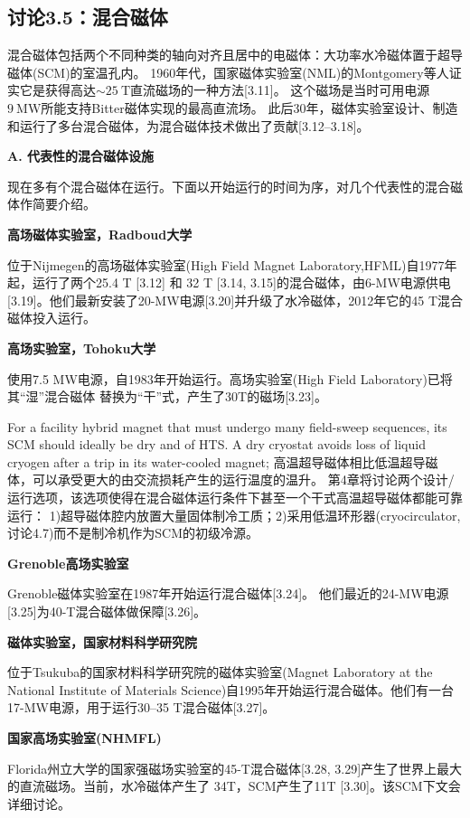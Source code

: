 \subsection{讨论3.5：混合磁体}
混合磁体包括两个不同种类的轴向对齐且居中的电磁体：大功率水冷磁体置于超导磁体(SCM)的室温孔内。
1960年代，国家磁体实验室(NML)的Montgomery等人证实它是获得高达$\sim 25\ \mathrm{T}$直流磁场的一种方法[3.11]。
这个磁场是当时可用电源$9\ \mathrm{MW}$所能支持Bitter磁体实现的最高直流场。
此后30年，磁体实验室设计、制造和运行了多台混合磁体，为混合磁体技术做出了贡献[3.12–3.18]。

\textbf{A. 代表性的混合磁体设施}

现在多有个混合磁体在运行。下面以开始运行的时间为序，对几个代表性的混合磁体作简要介绍。

\textbf{\kaishu 高场磁体实验室，Radboud大学}

位于Nijmegen的高场磁体实验室(High Field Magnet Laboratory,HFML)自1977年起，运行了两个25.4 T [3.12] 和 32 T [3.14, 3.15]的混合磁体，由6-MW电源供电[3.19]。他们最新安装了20-MW电源[3.20]并升级了水冷磁体，2012年它的45 T混合磁体投入运行。

\textbf{\kaishu 高场实验室，Tohoku大学}

使用7.5 MW电源，自1983年开始运行。高场实验室(High Field Laboratory)已将其“湿”混合磁体
替换为“干”式，产生了30T的磁场[3.23]。

For a facility hybrid magnet that must undergo many field-sweep sequences, its
SCM should ideally be dry and of HTS. A dry cryostat avoids loss of liquid cryogen
after a trip in its water-cooled magnet;
高温超导磁体相比低温超导磁体，可以承受更大的由交流损耗产生的运行温度的温升。
第4章将讨论两个设计/运行选项，该选项使得在混合磁体运行条件下甚至一个干式高温超导磁体都能可靠运行：
1)超导磁体腔内放置大量固体制冷工质；2)采用低温环形器(cryocirculator,讨论4.7)而不是制冷机作为SCM的初级冷源。

\textbf{\kaishu Grenoble高场实验室}

Grenoble磁体实验室在1987年开始运行混合磁体[3.24]。
他们最近的24-MW电源[3.25]为40-T混合磁体做保障[3.26]。

\textbf{\kaishu 磁体实验室，国家材料科学研究院}

位于Tsukuba的国家材料科学研究院的磁体实验室(Magnet Laboratory at the National Institute of Materials Science)自1995年开始运行混合磁体。他们有一台17-MW电源，用于运行30–35 T混合磁体[3.27]。

\textbf{\kaishu 国家高场实验室(NHMFL)}

Florida州立大学的国家强磁场实验室的45-T混合磁体[3.28, 3.29]产生了世界上最大的直流磁场。当前，水冷磁体产生了
34T，SCM产生了11T [3.30]。该SCM下文会详细讨论。

